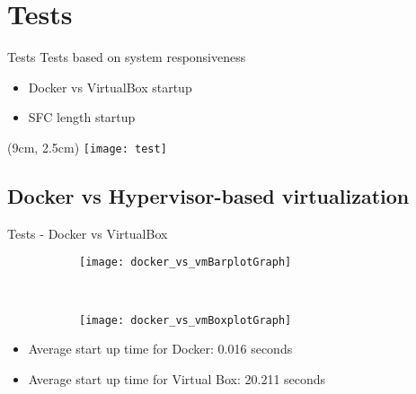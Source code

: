 \section{Tests}
\begin{frame}{Tests}
  Tests based on system responsiveness
  \begin{itemize}
    \item<1-> Docker vs VirtualBox startup
    \item<2-> SFC length startup 
  \end{itemize}

  \begin{textblock*}{5cm}(9cm, 2.5cm)
    \texttt{[image: test]}
  \end{textblock*}
\end{frame}

\subsection{Docker vs Hypervisor-based virtualization}
\begin{frame}{Tests - Docker vs VirtualBox}

  \begin{figure}
    \centering
    \begin{subfigure}[b]{0.45\textwidth}
      \texttt{[image: docker\_vs\_vmBarplotGraph]}
    \end{subfigure}
    ~
    \begin{subfigure}[b]{0.45\textwidth}
      \texttt{[image: docker\_vs\_vmBoxplotGraph]}
    \end{subfigure}
  \end{figure}
  \begin{itemize}
  \item Average start up time for Docker: 0.016 seconds
  \item Average start up time for Virtual Box: 20.211 seconds
  \end{itemize}
\end{frame}

